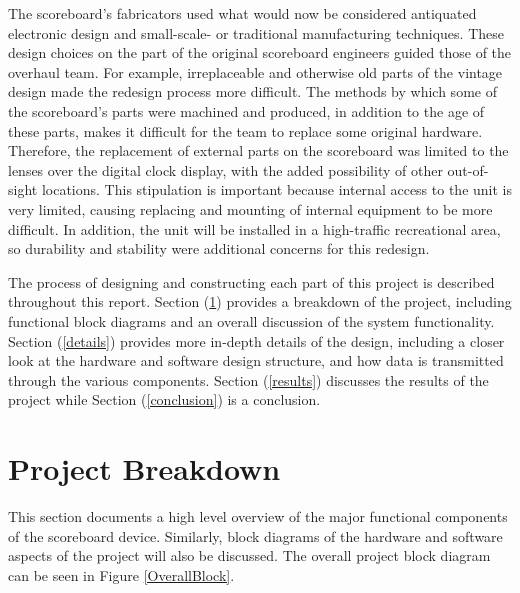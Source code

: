 \documentclass[11pt]{article}
\begin{document}
The scoreboard's fabricators used what would now be considered antiquated electronic design and small-scale- or traditional manufacturing techniques.
These design choices on the part of the original scoreboard engineers guided those of the overhaul team.
For example, irreplaceable and otherwise old parts of the vintage design made the redesign process more difficult.
The methods by which some of the scoreboard's parts were machined and produced, in addition to the age of these parts, makes it difficult for the team to replace some original hardware.
Therefore, the replacement of external parts on the scoreboard was limited to the lenses over the digital clock display, with the added possibility of other out-of-sight locations. 
This stipulation is important because internal access to the unit is very limited, causing replacing and mounting of internal equipment to be more difficult. 
In addition, the unit will be installed in a high-traffic recreational area, so durability and stability were additional concerns for this redesign.

The process of designing and constructing each part of this project is described throughout this report. 
Section (\ref{breakdown}) provides a breakdown of the project, including functional block diagrams and an overall discussion of the system functionality. 
Section (\ref{details}) provides more in-depth details of the design, including a closer look at the hardware and software design structure, and how data is transmitted through the various components. 
Section (\ref{results}) discusses the results of the project while Section (\ref{conclusion}) is a conclusion. 


\section{Project Breakdown}
\label{breakdown}
This section documents a high level overview of the major functional components of the scoreboard device. 
Similarly, block diagrams of the hardware and software aspects of the project will also be discussed. 
The overall project block diagram can be seen in Figure \ref{OverallBlock}.
\end{document}
